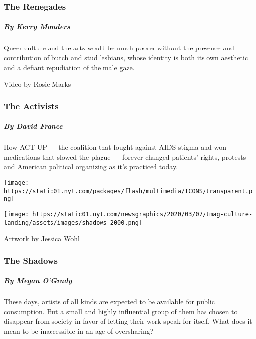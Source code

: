 \hypertarget{the-renegades}{%
\subsubsection{The Renegades}\label{the-renegades}}

\hypertarget{by-kerry-manders}{%
\subparagraph{By Kerry Manders}\label{by-kerry-manders}}

Queer culture and the arts would be much poorer without the presence and
contribution of butch and stud lesbians, whose identity is both its own
aesthetic and a defiant repudiation of the male gaze.

\href{https://www.nytimes.com/interactive/2020/04/13/t-magazine/act-up-aids.html}{}

Video by Rosie Marks

\hypertarget{the-activists}{%
\subsubsection{The Activists}\label{the-activists}}

\hypertarget{by-david-france}{%
\subparagraph{By David France}\label{by-david-france}}

How ACT UP --- the coalition that fought against AIDS stigma and won
medications that slowed the plague --- forever changed patients' rights,
protests and American political organizing as it's practiced today.

\href{https://www.nytimes.com/interactive/2020/04/13/t-magazine/artist-recluse.html}{}

\texttt{[image: https://static01.nyt.com/packages/flash/multimedia/ICONS/transparent.png]}

\texttt{[image: https://static01.nyt.com/newsgraphics/2020/03/07/tmag-culture-landing/assets/images/shadows-2000.png]}

Artwork by Jessica Wohl

\hypertarget{the-shadows}{%
\subsubsection{The Shadows}\label{the-shadows}}

\hypertarget{by-megan-ogrady}{%
\subparagraph{By Megan O'Grady}\label{by-megan-ogrady}}

These days, artists of all kinds are expected to be available for public
consumption. But a small and highly influential group of them has chosen
to disappear from society in favor of letting their work speak for
itself. What does it mean to be inaccessible in an age of oversharing?

